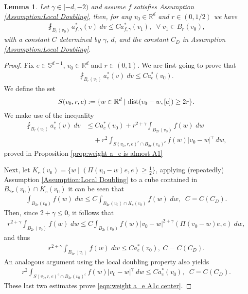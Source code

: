 \documentclass[12pt,american]{amsart}
\numberwithin{equation}{section}
\theoremstyle{plain}
\newtheorem{lem}[thm]{Lemma}
\theoremstyle{definition}                  %
\begin{document}
\begin{lem}\label{lem:a star is A1 if f is doubling}
 Let $\gamma \in [-d,-2)$ and assume $f$ satisfies Assumption \ref{Assumption:Local Doubling}, then, for any $v_0 \in \mathbb{R}^d$ and $r\in(0,1/2)$ we have
  \begin{align*}
    \fint_{B_r(v_0)}a^*_{f,\gamma}(v) \;dv\leq Ca^*_{f,\gamma}(v_1), \;\;\forall\;v_1 \in B_r(v_0),
  \end{align*}	  
  with a constant $C$ determined by $\gamma$, $d$, and the constant $C_D$ in Assumption \ref{Assumption:Local Doubling}.
\end{lem}

\begin{proof}
  Fix $e\in\mathbb{S}^{d-1}$, $v_0 \in \mathbb{R}^d$ and $r\in (0,1)$. 
  We are first going to prove that 
  \begin{align}\label{eqn:weight a_e A1c center}
    \fint_{B_r(v_0)}a_e^*(v)\;dv\leq Ca_e^*(v_0).	  
  \end{align}	
  We define  the set 
  \begin{align*}
    S(v_0,r,e) := \{ w \in\mathbb{R}^d \mid \textnormal{dist}(v_0-w,[e]) \geq 2r\}.
  \end{align*}
  We make use of the inequality	
  \begin{align*}
    \fint_{B_r(v_0)}a^*_e(v)\;dv  & \leq Ca^*_e(v_0)+r^{2+\gamma}\int_{B_{2r}(v_0)}f(w)\;dw\\
	  & \;\;\;\;+r^2\int_{S(v_0,r,e)^c \cap B_{2r}(v_0)^c}f(w)|v_0-w|^\gamma\;dw,
  \end{align*}
  proved in Proposition \ref{prop:weight a_e is almost A1}
  
  Next, let $K_e(v_0) = \{ w\mid (\Pi(v_0-w)e,e)\geq \tfrac{1}{2} \}$, applying (repeatedly) Assumption \ref{Assumption:Local Doubling} to a cube contained in $B_{2r}(v_0) \cap K_e(v_0)$ it can be seen that
  \begin{align*}
    \int_{B_{2r}(v_0)}f(w)\;dw \leq C\int_{B_{2r}(v_0) \cap K_e(v_0) }f(w)\;dw,\;\; C = C(C_D).
  \end{align*}	  
  Then, since $2+\gamma\leq 0$, it follows that
  \begin{align*}
    r^{2+\gamma}\int_{B_{2r}(v_0)}f(w)\;dw \leq C\int_{B_{2r}(v_0)}f(w)|v_0-w|^{2+\gamma}(\Pi(v_0-w)e,e)\;dw, 	  
  \end{align*}	   
  and thus
  \begin{align*}
    r^{2+\gamma}\int_{B_{2r}(v_0)}f(w)\;dw \leq Ca_e^*(v_0),\;C=C(C_D).
  \end{align*}	   
  An analogous argument using the local doubling property also yields  
  \begin{align*}
    r^2\int_{S(v_0,r,e)^c \cap B_{2r}(v_0)^c}f(w)|v_0-w|^\gamma\;dw \leq Ca^*_e(v_0),\;\;C=C(C_D).
  \end{align*}	  
  These last two estimates prove \eqref{eqn:weight a_e A1c center}. 
  

\end{proof}
\end{document}
